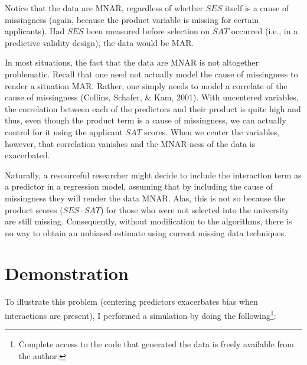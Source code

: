 \documentclass[english,man]{apa6}
\newcounter{author}
\theoremstyle{definition}
\theoremstyle{definition}
\theoremstyle{remark}
\begin{document}
Notice that the data are MNAR, regardless of whether \(SES\) itself is a
cause of missingness (again, because the product variable is missing for
certain applicants). Had \(SES\) been measured before selection on
\(SAT\) occurred (i.e., in a predictive validity design), the data would
be MAR.

In most situations, the fact that the data are MNAR is not altogether
problematic. Recall that one need not actually model the cause of
missingness to render a situation MAR. Rather, one simply needs to model
a correlate of the cause of missingness (Collins, Schafer, \& Kam,
2001). With uncentered variables, the correlation between each of the
predictors and their product is quite high and thus, even though the
product term is a cause of missingness, we can actually control for it
using the applicant \(SAT\) scores. When we center the variables,
however, that correlation vanishes and the MNAR-ness of the data is
exacerbated.

Naturally, a resourceful researcher might decide to include the
interaction term as a predictor in a regression model, assuming that by
including the cause of missingness they will render the data MNAR. Alas,
this is not so because the product scores (\(SES\cdot SAT\)) for those
who were not selected into the university are still missing.
Consequently, without modification to the algorithms, there is no way to
obtain an unbiased estimate using current missing data techniques.

\section{Demonstration}\label{demonstration}

To illustrate this problem (centering predictors exacerbates bias when
interactions are present), I performed a simulation by doing the
following\footnote{Complete access to the code that generated the data
  is freely available from the author:}:
\end{document}
